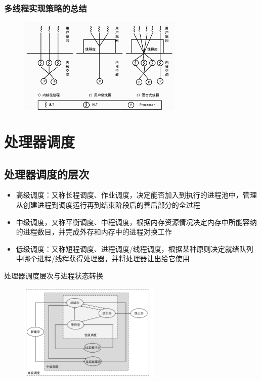 \documentclass[cs4size,a4paper,10pt]{ctexart}
\begin{document}
	\subsubsection{多线程实现策略的总结}
	\begin{figure}[H]
		\centering
		\includegraphics[width=0.7\textwidth]{img/2.4.3.4}
	\end{figure}


	\section{处理器调度}
	\subsection{处理器调度的层次}
	\begin{itemize}
		\item 高级调度：又称长程调度、作业调度，决定能否加入到执行的进程池中，管理从创建进程到调度运行再到结束阶段后的善后部分的全过程
		\item 中级调度，又称平衡调度、中程调度，根据内存资源情况决定内存中所能容纳的进程数目，并完成外存和内存中的进程对换工作
		\item 低级调度：又称短程调度、进程调度/线程调度，根据某种原则决定就绪队列中哪个进程/线程获得处理器，并将处理器让出给它使用
	\end{itemize}

	处理器调度层次与进程状态转换
	\begin{figure}[H]
		\centering
		\includegraphics[width=0.6\textwidth]{img/2.5.1}
	\end{figure}
\end{document}
